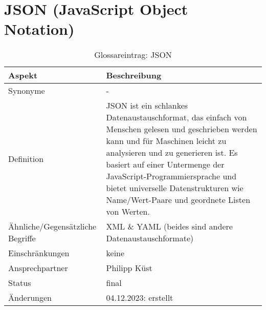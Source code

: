 \section{JSON (JavaScript Object Notation)}\label{sec:glossar_json}
\begin{table}[H]
    \label{tab:glossar_json}
    \begin{tabularx}{\textwidth}{|l|X|}
        \hline
        \textbf{Aspekt}                  & \textbf{Beschreibung}                                  \\
        \hline
        Synonyme                         & -                                                      \\
        \hline
        Definition & JSON ist ein schlankes Datenaustauschformat, das einfach von Menschen gelesen und geschrieben werden kann und für Maschinen leicht zu analysieren und zu generieren ist.
        Es basiert auf einer Untermenge der JavaScript-Programmiersprache und bietet universelle Datenstrukturen wie Name/Wert-Paare und geordnete Listen von Werten. \\
        \hline
        Ähnliche/Gegensätzliche Begriffe & XML \& YAML (beides sind andere Datenaustauschformate) \\
        \hline
        Einschränkungen                  & keine                                                  \\
        \hline
        Ansprechpartner                  & Philipp Küst                                           \\
        \hline
        Status                           & final                                                  \\
        \hline
        Änderungen                       & 04.12.2023: erstellt                                   \\
        \hline
    \end{tabularx}
    \caption{Glossareintrag: JSON}
\end{table}


